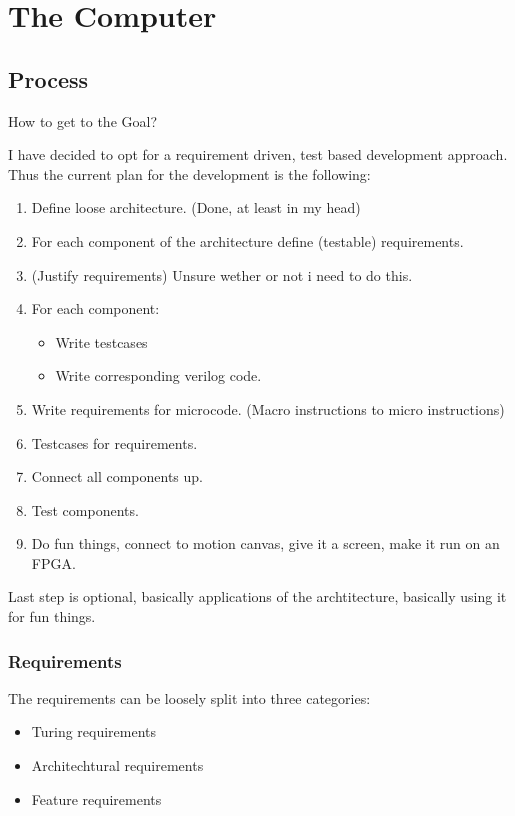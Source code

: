 \chapter{The Computer}  

\section{Process}
How to get to the Goal?

I have decided to opt for a requirement driven, test based development approach. Thus the current plan for the development is the following:
\begin{enumerate}
  \item Define loose architecture. (Done, at least in my head)
  \item For each component of the architecture define (testable) requirements. 
  \item (Justify requirements) Unsure wether or not i need to do this.
  \item For each component:
  \begin{itemize}
    \item Write testcases
    \item Write corresponding verilog code.
  \end{itemize}
  \item Write requirements for microcode. (Macro instructions to micro instructions) 
  \item Testcases for requirements. 
  \item Connect all components up.
  \item Test components.
  \item Do fun things, connect to motion canvas, give it a screen, make it run on an FPGA.
\end{enumerate}

Last step is optional, basically applications of the archtitecture, basically using it for fun things. 


\subsection{Requirements}
The requirements can be loosely split into three categories:

\begin{itemize}
  \item Turing requirements
  \item Architechtural requirements
  \item Feature requirements
\end{itemize}


